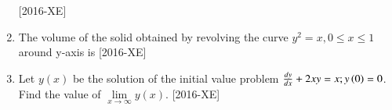 \documentclass[journal]{IEEEtran}
\begin{document}
\begin{enumerate}
    \hfill{[2016-XE]}
\begin{enumerate}
\end{enumerate}
\item The volume of the solid obtained by revolving the curve $y^2=x, 0\leq x \leq 1$ around y-axis is \hfill{[2016-XE]}
\begin{enumerate}
\end{enumerate}
\item Let $y(x)$ be the solution of the initial value problem $\frac{dy}{dx}+2xy=x; y\left(0\right)=0$. Find the value of $\lim\limits_{x\to \infty} y(x)$. \hfill{[2016-XE]}
\end{enumerate}
\end{document}
